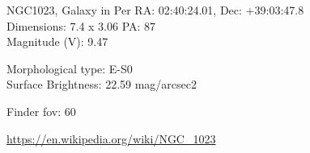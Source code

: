 \begin{block}{NGC1023, Galaxy in Per}
    RA: 02:40:24.01, Dec: +39:03:47.8 \\ 
    Dimensions: 7.4 x 3.06 PA: 87 \\ 
    Magnitude (V): 9.47

    Morphological type: E-S0 \\ 
    Surface Brightness: 22.59 mag/arcsec2 


    Finder fov: 60 

    \url{https://en.wikipedia.org/wiki/NGC_1023} 
\end{block}